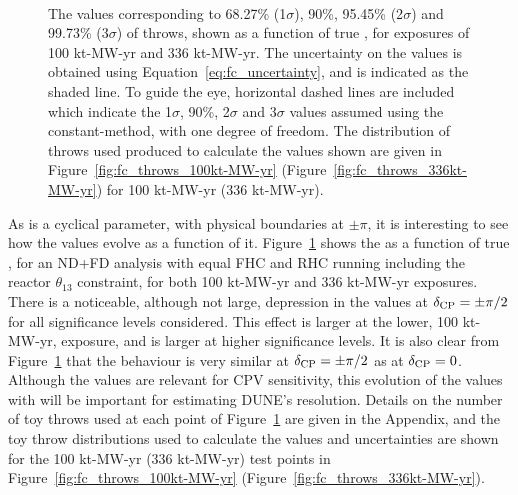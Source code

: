 \begin{figure}[htbp]
  \centering
  \\
  \caption{The \dchisqcrit values corresponding to 68.27\% (1$\sigma$), 90\%, 95.45\% (2$\sigma$) and 99.73\% (3$\sigma$) of throws, shown as a function of true \deltacp, for exposures of 100 kt-MW-yr and 336 kt-MW-yr. The uncertainty on the \dchisqcrit values is obtained using Equation~\ref{eq:fc_uncertainty}, and is indicated as the shaded line. To guide the eye, horizontal dashed lines are included which indicate the 1$\sigma$, 90\%, 2$\sigma$ and 3$\sigma$ \dchisqCPV values assumed using the constant-\dchisq method, with one degree of freedom. The distribution of throws used produced to calculate the \dchisqcrit values shown are given in Figure~\ref{fig:fc_throws_100kt-MW-yr} (Figure~\ref{fig:fc_throws_336kt-MW-yr}) for 100 kt-MW-yr (336 kt-MW-yr).}
  \label{fig:fc_vs_dcp}
\end{figure}
As \deltacp is a cyclical parameter, with physical boundaries at $\pm\pi$, it is interesting to see how the \dchisqcrit values evolve as a function of it. Figure~\ref{fig:fc_vs_dcp} shows the \dchisqcrit as a function of true \deltacp, for an ND+FD analysis with equal FHC and RHC running including the reactor $\theta_{13}$ constraint, for both 100 kt-MW-yr and 336 kt-MW-yr exposures. There is a noticeable, although not large, depression in the \dchisqcrit values at $\delta_{\rm CP} = \pm\pi/2$ for all significance levels considered. This effect is larger at the lower, 100 kt-MW-yr, exposure, and is larger at higher significance levels. It is also clear from Figure~\ref{fig:fc_vs_dcp} that the \dchisqcrit behaviour is very similar at $\delta_{\rm CP} = \pm\pi/2$ as at $\delta_{\rm CP} = 0$. Although the \dchisqcrit values are relevant for CPV sensitivity, this evolution of the \dchisqcrit values with \deltacp will be important for estimating DUNE's \deltacp resolution. Details on the number of toy throws used at each point of Figure~\ref{fig:fc_vs_dcp} are given in the Appendix, and the toy throw distributions used to calculate the \dchisqcrit values and uncertainties are shown for the 100 kt-MW-yr (336 kt-MW-yr) test points in Figure~\ref{fig:fc_throws_100kt-MW-yr} (Figure~\ref{fig:fc_throws_336kt-MW-yr}).

